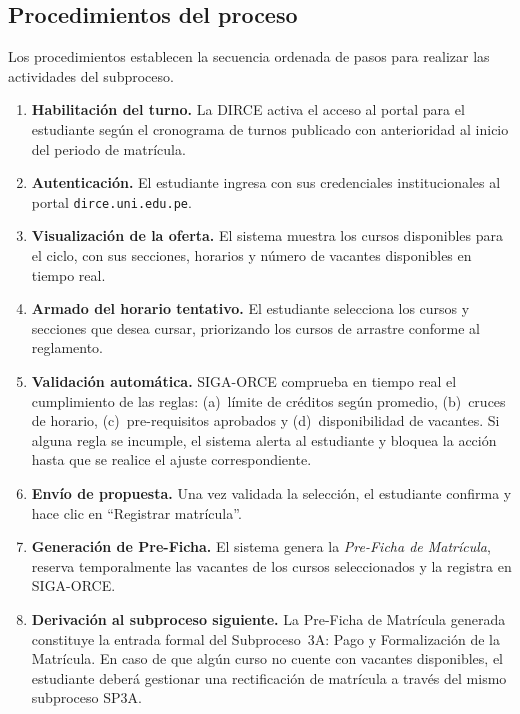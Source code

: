 \subsection{Procedimientos del proceso}

Los procedimientos establecen la secuencia ordenada de pasos para
realizar las actividades del subproceso.

\begin{enumerate}
  \item \textbf{Habilitación del turno.} La DIRCE activa el acceso al
        portal para el estudiante según el cronograma de turnos publicado
        con anterioridad al inicio del periodo de matrícula.

  \item \textbf{Autenticación.} El estudiante ingresa con sus credenciales
        institucionales al portal \texttt{dirce.uni.edu.pe}.

  \item \textbf{Visualización de la oferta.} El sistema muestra los cursos
        disponibles para el ciclo, con sus secciones, horarios y número
        de vacantes disponibles en tiempo real.

  \item \textbf{Armado del horario tentativo.} El estudiante selecciona
        los cursos y secciones que desea cursar, priorizando los cursos
        de arrastre conforme al reglamento.

  \item \textbf{Validación automática.} SIGA-ORCE comprueba en tiempo real
        el cumplimiento de las reglas: (a)~límite de créditos según
        promedio, (b)~cruces de horario, (c)~pre-requisitos aprobados y
        (d)~disponibilidad de vacantes. Si alguna regla se incumple, el
        sistema alerta al estudiante y bloquea la acción hasta que se
        realice el ajuste correspondiente.

  \item \textbf{Envío de propuesta.} Una vez validada la selección, el
        estudiante confirma y hace clic en ``Registrar matrícula''.

  \item \textbf{Generación de Pre-Ficha.} El sistema genera la
        \textit{Pre-Ficha de Matrícula}, reserva temporalmente las
        vacantes de los cursos seleccionados y la registra en SIGA-ORCE.

  \item \textbf{Derivación al subproceso siguiente.} La Pre-Ficha de
        Matrícula generada constituye la entrada formal del
        Subproceso~3A: Pago y Formalización de la Matrícula. En caso de
        que algún curso no cuente con vacantes disponibles, el estudiante
        deberá gestionar una rectificación de matrícula a través del
        mismo subproceso SP3A.
\end{enumerate}

